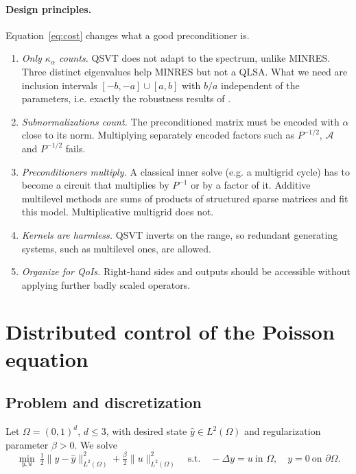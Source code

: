\documentclass[11pt,a4paper]{article}
\newcommand{\A}{\mathcal{A}}
\theoremstyle{remark}
\begin{document}
\paragraph{Design principles.} Equation~\eqref{eq:cost} changes what a good
preconditioner is.
\begin{enumerate}
\item[(D1)] \emph{Only $\kappa_\alpha$ counts.} QSVT does not adapt to the spectrum,
  unlike MINRES. Three distinct eigenvalues help MINRES but not a QLSA.
  What we need are inclusion intervals $[-b,-a]\cup[a,b]$ with $b/a$
  independent of the parameters, i.e. exactly the robustness results of
  \cite{SZ07,PW12}.
\item[(D2)] \emph{Subnormalizations count.} The preconditioned matrix must be
  encoded with $\alpha$ close to its norm. Multiplying separately encoded
  factors such as $P^{-1/2}$, $\A$ and $P^{-1/2}$ fails.
\item[(D3)] \emph{Preconditioners multiply.} A classical inner solve
  (e.g. a multigrid cycle) has to become a circuit that multiplies by
  $P^{-1}$ or by a factor of it. Additive multilevel methods \cite{BPX90,Xu92}
  are sums of products of structured sparse matrices and fit this
  model. Multiplicative multigrid does not.
\item[(D4)] \emph{Kernels are harmless.} QSVT inverts on the range, so
  redundant generating systems, such as multilevel ones, are allowed.
\item[(D5)] \emph{Organize for QoIs.} Right-hand sides and outputs should be
  accessible without applying further badly scaled operators.
\end{enumerate}

\section{Distributed control of the Poisson equation}\label{sec:poisson}

\subsection{Problem and discretization}

Let $\Omega=(0,1)^d$, $d\le3$, with desired state $\hat y\in L^2(\Omega)$ and
regularization parameter $\beta>0$. We solve
\begin{equation}\label{eq:ocp}
\min_{y,u}\ \tfrac12\|y-\hat y\|_{L^2(\Omega)}^2+\tfrac{\beta}{2}\|u\|_{L^2(\Omega)}^2
\quad\text{s.t.}\quad -\Delta y=u\ \text{in }\Omega,\quad y=0\ \text{on }\partial\Omega .
\end{equation}
\end{document}
